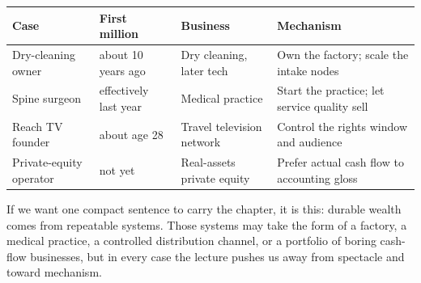 \begin{table}[h]
\centering
\begin{tabular}{llll}
\hline
Case & First million & Business & Mechanism \\
\hline
Dry-cleaning owner & about 10 years ago & Dry cleaning, later tech & Own the factory; scale the intake nodes \\
Spine surgeon & effectively last year & Medical practice & Start the practice; let service quality sell \\
Reach TV founder & about age 28 & Travel television network & Control the rights window and audience \\
Private-equity operator & not yet & Real-assets private equity & Prefer actual cash flow to accounting gloss \\
\hline
\end{tabular}
\end{table}

If we want one compact sentence to carry the chapter, it is this: durable wealth comes from repeatable systems. Those systems may take the form of a factory, a medical practice, a controlled distribution channel, or a portfolio of boring cash-flow businesses, but in every case the lecture pushes us away from spectacle and toward mechanism.